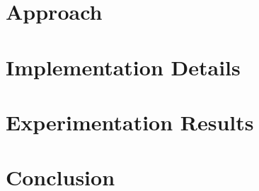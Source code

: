 \documentclass[a4paper,12pt]{report}
\begin{document}
\chapter{Approach\label{intro}}


\chapter{Implementation Details\label{intro}}


\chapter{Experimentation Results\label{intro}}


\chapter{Conclusion\label{intro}}


\newpage
{}
\begin{spacing}{1.5}
\nocite{*}

%

\end{spacing}


\end{document}
